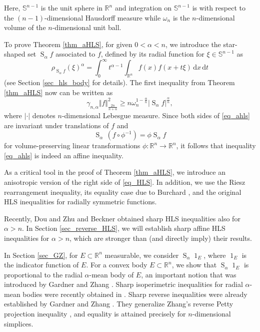 \documentclass{amsart}
\newcommand{\R}{\mathbb R}
\newcommand{\sn}{{\mathbb S}^{n-1}}
\renewcommand{\d}{\,\mathrm{d}}
\newcommand{\vol}[1]{\vert #1\vert}
\renewcommand{\chi}{\operatorname{1}}
\newcommand{\hls}[1]{\operatorname{S}_{#1}\!} %
\begin{document}
\noindent
Here, $\sn$ is the unit sphere in $\R^n$ and integration on $\sn$ is with respect to the $(n-1)$-dimensional Hausdorff measure while $\omega_n$ is the $n$-dimensional volume of the $n$-dimensional unit ball.

\goodbreak
To prove Theorem \ref{thm_aHLS}, for given $0<\alpha<n$, we introduce the star-shaped set $\hls \alpha f$ associated to $f$, defined by its radial function for $\xi\in\sn$ as
\begin{equation}\label{eq_defhls}
\rho_{\hls{\alpha}f}(\xi)^{\alpha}= \int_0^\infty t^{\alpha -1} \int_{\R^n} f(x)f(x+t\xi) \d x \d t
\end{equation}
(see Section \ref{sec_hls_body} for details). The first inequality from Theorem \ref{thm_aHLS}  now can be written as
\begin{equation}\label{eq_ahls}
\gamma_{n,\alpha} \Vert f\Vert_{\frac{2n}{n+\alpha}}^2
\ge
n \omega_n^{{1-\frac \alpha n}} \vol{\hls \alpha f}^{\frac \alpha n},
\end{equation}
where $\vol{\cdot}$ denotes $n$-dimensional Lebesgue measure. Since both sides of \eqref{eq_ahls} are invariant under translations of $f$ and 
\[ \hls{\alpha} \,(f\circ\phi^{-1}) = \phi \hls{\alpha} f\]
for volume-preserving linear transformations $\phi: \R^n\to \R^n$,
it follows that inequality \eqref{eq_ahls} is indeed an affine inequality. 

As a critical tool in the proof of Theorem \ref{thm_aHLS}, we introduce an anisotropic version of the right side of \eqref{eq_HLS}. In addition, we use the Riesz rearrangement inequality, its equality case due to Burchard \cite{Burchard96}, and  the original HLS inequalities for radially symmetric functions. 

Recently, Dou and Zhu \cite{DouZhu15} and Beckner \cite{Beckner2015} obtained sharp HLS inequalities also  for $\alpha>n$. In Section \ref{sec_reverse_HLS}, we will establish sharp affine HLS inequalities for $\alpha>n$, which are stronger than (and directly imply) their results.

In Section \ref{sec_GZ}, for $E\subset \R^n$ measurable, we consider $\hls \alpha \chi_E$, where $\chi_E$ is the indicator function of $E$. For a convex body $E\subset \R^n$, we show that $\hls \alpha \chi_E$ is proportional to the radial $\alpha$-mean body of $E$, an important notion that was introduced by Gardner and Zhang \cite{GZ}. Sharp isoperimetric inequalities for radial $\alpha$-mean bodies were recently obtained in \cite{HaddadLudwig_fracsob}. Sharp reverse inequalities were already established by Gardner and Zhang \cite{GZ}. They generalize Zhang's reverse Petty projection inequality \cite{Zhang91}, and equality is attained precisely for $n$-dimensional simplices.  
\end{document}
